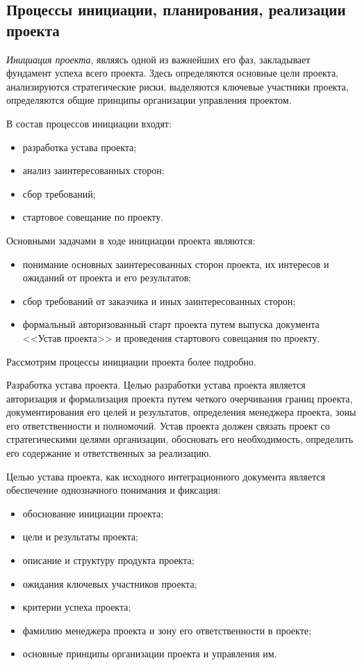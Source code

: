 \subsection{Процессы инициации, планирования, реализации проекта}

\textit{Инициация проекта}, являясь одной из важнейших его фаз, закладывает фундамент успеха всего проекта.
Здесь определяются основные цели проекта, анализируются стратегические риски, выделяются ключевые участники проекта, определяются общие принципы организации управления проектом.

В состав процессов инициации входят:
\begin{itemize}
	\item  разработка устава проекта;
	\item  анализ заинтересованных сторон;
	\item  сбор требований;
	\item  стартовое совещание по проекту.
\end{itemize}

Основными задачами в ходе инициации проекта являются:
\begin{itemize}
	\item понимание основных заинтересованных сторон проекта, их интере­сов и ожиданий от проекта и его результатов;
	\item сбор требований от заказчика и иных заинтересованных сторон;
	\item формальный авторизованный старт проекта путем выпуска до­кумента <<Устав проекта>> и проведения стартового совещания по
	проекту.
\end{itemize}

Рассмотрим процессы инициации проекта более подробно.

Разработка устава проекта.
Целью разработки устава проекта является авторизация и формализа­ция проекта путем четкого очерчивания границ проекта, документиро­вания его целей и результатов, определения менеджера проекта, зоны его ответственности и полномочий.
Устав проекта должен связать проект со стратегическими целями организации, обосновать его необходимость, определить его содержа­ние и ответственных за реализацию.

Целью устава проекта, как исходного интеграционного документа является обеспечение однозначного понимания и фиксация:
\begin{itemize}
	\item  обоснование инициации проекта;
	\item  цели и результаты проекта;
	\item  описание и структуру продукта проекта;
	\item ожидания ключевых участников проекта;
	\item критерии успеха проекта;
	\item фамилию менеджера проекта и зону его ответственности в проекте;
	\item основные принципы организации проекта и управления им.
\end{itemize}

